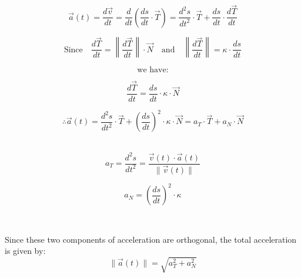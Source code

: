 \documentclass{article}
\begin{document}
\begin{equation}
    \vec{a}(t) = \frac{d\vec{v}}{dt} = \frac{d}{dt} \left( \frac{ds}{dt} \cdot \vec{T} \right) = \frac{d^2s}{dt^2} \cdot \vec{T} + \frac{ds}{dt} \cdot \frac{d\vec{T}}{dt}  
\end{equation}

\begin{equation}
    \text{Since} \quad \frac{d\vec{T}}{dt} = \left\lVert \frac{d\vec{T}}{dt} \right\rVert \cdot \vec{N} \quad \text{and} \quad \left\lVert \frac{d\vec{T}}{dt} \right\rVert = \kappa \cdot \frac{ds}{dt}
\end{equation}

\begin{equation}
    \text{we have:}
\end{equation}

\begin{equation}
    \frac{d\vec{T}}{dt} = \frac{ds}{dt} \cdot \kappa \cdot \vec{N}
\end{equation}

\begin{equation}
    \therefore \vec{a}(t) = \frac{d^2s}{dt^2} \cdot \vec{T} + \left(\frac{ds}{dt}\right)^2 \cdot \kappa \cdot \vec{N} = a_T \cdot \vec{T} + a_N \cdot \vec{N}
\end{equation} \\
\newline
\noindent
\begin{minipage}{0.45\textwidth}
\begin{equation}
    a_T = \frac{d^2s}{dt^2} = \frac{\vec{v}(t) \cdot \vec{a}(t)}{\lVert \vec{v}(t) \rVert}
\end{equation}
\end{minipage}
\hfill
\begin{minipage}{0.45\textwidth}
\begin{equation}
    a_N = \left(\frac{ds}{dt}\right)^2 \cdot \kappa
\end{equation}
\end{minipage} \\
\newline

Since these two components of acceleration are orthogonal, the total acceleration is given by: \\

\begin{equation}
    \lVert \vec{a}(t) \rVert = \sqrt{a_T^2 + a_N^2}
\end{equation}
\end{document}
